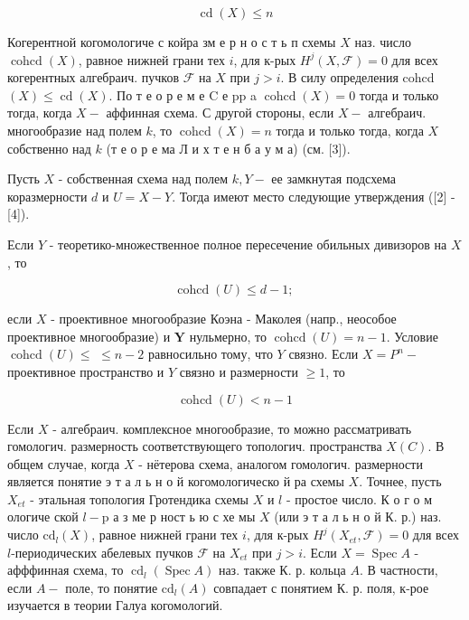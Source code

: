\documentclass[10pt]{article}
\begin{document}
\[

\operatorname{cd}(X) \leqslant n

\]



Когерентной когомологиче с койра зм е р н о с т ь п схемы $X$ наз. число $\operatorname{cohcd}(X)$, равное нижней грани тех $i$, для к-рых $H^{j}(X, \mathscr{F})=0$ для всех когерентных алгебраич. пучков $\mathscr{F}$ на $X$ при $j>i$. В силу определения cohcd $(X) \leqslant \operatorname{cd}(X)$. По т е о р е м е $\mathrm{C}$ е pp a $\operatorname{cohcd}(X)=0$ тогда и только тогда, когда $X-$ аффинная схема. С другой стороны, если $X-$ алгебраич. многообразие над полем $k$, то $\operatorname{cohcd}(X)=n$ тогда и только тогда, когда $X$ собственно над $k$ (т е о р е ма Л и х т е н б а у м а) (см. [3]).



Пусть $X$ - собственная схема над полем $k, Y-$ ее замкнутая подсхема коразмерности $d$ и $U=X-Y$. Тогда имеют место следующие утверждения ([2] - [4]).



Если $Y$ - теоретико-множественное полное пересечение обильных дивизоров на $X$, то



\[

\operatorname{cohcd}(U) \leqslant d-1 \text {; }

\]



если $X$ - проективное многообразие Коэна - Маколея (напр., неособое проективное многообразие) и $\boldsymbol{Y}$ нульмерно, то $\operatorname{cohcd}(U)=n-1$. Условие $\operatorname{cohcd}(U) \leqslant$ $\leqslant n-2$ равносильно тому, что $Y$ связно. Если $X=P^{n}-$ проективное пространство и $Y$ связно и размерности $\geqslant 1$, то



\[

\operatorname{cohcd}(U)<n-1

\]



Если $X$ - алгебраич. комплексное многообразие, то можно рассматривать гомологич. размерность соответствующего топологич. пространства $X(C)$. В общем случае, когда $X$ - нётерова схема, аналогом гомологич. размерности является понятие э т а л ь н о й когомологическо й ра схемы $X$. Точнее, пусть $X_{e t}$ - этальная топология Гротендика схемы $X$ и $l$ - простое число. К о г о м ологиче ской $l-\mathrm{p}$ а з ме р ност ь ю с хе мы $X$ (или э т а л ь н о й К. р.) наз. число $\mathrm{cd}_{l}(X)$, равное нижней грани тех $i$, для к-рых $H^{j}\left(X_{e t}, \mathscr{F}\right)=0$ для всех $l$-периодических абелевых пучков $\mathscr{F}$ на $X_{e t}$ при $j>i$. Если $X=\operatorname{Spec} A$ - афффинная схема, то $\operatorname{cd}_{l}(\operatorname{Spec} A)$ наз. также К. р. кольца $A$. В частности, если $A-$ поле, то понятие $\mathrm{cd}_{l}(A)$ совпадает с понятием К. р. поля, к-рое изучается в теории Галуа когомологий.
\end{document}
